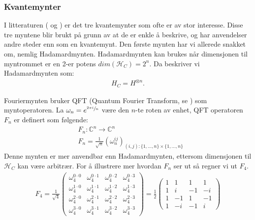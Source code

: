     \subsubsection{Kvantemynter}

        I litteraturen (\cite{Venegas_Andraca_2012} og \cite{portugal_2019}) er det tre kvantemynter som ofte er av stor interesse. Disse tre myntene blir brukt på grunn av at de er enkle å beskrive, og har anvendelser andre steder enn som en kvantemynt. Den første mynten har vi allerede snakket om, nemlig Hadamardmynten. Hadamardmynten kan brukes når dimensjonen til myntrommet er en 2-er potens $dim(\mathcal{H}_C)=2^n$. Da beskriver vi Hadamardmynten som:
        \begin{align*}
            H_C=H^{\otimes n}.
        \end{align*}

        Fouriermynten bruker QFT (Quantum Fourier Transform, se \cite{dewolf2021quantum}) som myntoperatoren. La $\omega_n = e^{\sfrac{2\pi i}{n}}$ være den $n$-te roten av enhet, QFT operatoren $F_n$ er definert som følgende:
        \begin{align*}
            & F_n : \mathbb{C}^n\rightarrow\mathbb{C}^n \\
            & F_n = \frac{1}{\sqrt{n}}(\omega_n^{ij})_{(i,j):\{1,...,n\}\times \{1,...,n\}}
        \end{align*}
        Denne mynten er mer anvendbar enn Hadamardmynten, ettersom dimensjonen til $\mathcal{H}_C$ kan være arbitrær. For å illustrere mer hvordan $F_n$ ser ut så regner vi ut $F_4$.
        \begin{align*}
            F_4 = \frac{1}{\sqrt{4}}\begin{pmatrix}
                \omega_4^{0\cdot 0} & \omega_4^{0\cdot 1} & \omega_4^{0\cdot 2} & \omega_4^{0\cdot 3} \\
                \omega_4^{1\cdot 0} & \omega_4^{1\cdot 1} & \omega_4^{1\cdot 2} & \omega_4^{1\cdot 3} \\
                \omega_4^{2\cdot 0} & \omega_4^{2\cdot 1} & \omega_4^{2\cdot 2} & \omega_4^{2\cdot 3} \\
                \omega_4^{3\cdot 0} & \omega_4^{3\cdot 1} & \omega_4^{3\cdot 2} & \omega_4^{3\cdot 3}
            \end{pmatrix}
            = \frac{1}{2}\begin{pmatrix}
                1 & 1 & 1 & 1 \\
                1 & i & -1 & -i \\
                1 & -1 & 1 & -1 \\
                1 & -i & -1 & i
            \end{pmatrix}
        \end{align*}

